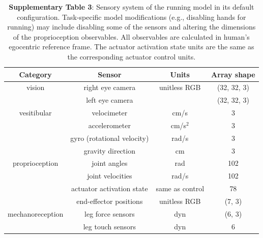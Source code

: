 \documentclass[sn-mathphys-num]{sn-jnl}%
\theoremstyle{thmstyleone}	%
\theoremstyle{thmstyletwo}	%
\theoremstyle{thmstylethree}	%
\begin{document}
\begin{appendices}
\begin{table}[htbp]
\begin{tabular}{ccc}
		\bottomrule
	\end{tabular}%
	\label{tab:s_2}%
\end{table}%




\begin{table}[htbp]
	\centering
	\small
	\caption{%
		\textbf{Supplementary Table 3}: 
		Sensory system of the running model in its default configuration. 
		Task-specific model modifications (e.g., disabling hands for running) may include disabling some of the sensors and altering the dimensions of the proprioception observables. 
		All observables are calculated in human's egocentric reference frame. 
		The actuator activation state units are the same as the corresponding actuator control units.}
	\begin{tabular}{cccc}
		\toprule
		Category         &        Sensor  & Units  & Array shape   \\
		\midrule
		vision      &   right eye camera      &    unitless RGB & (32, 32, 3)  \\
		      &   left eye camera      &     & (32, 32, 3)  \\
		\midrule
		vesitibular      &   velocimeter      &    cm/s & 3  \\
		      &   accelerometer      &    cm/s$ ^2 $ & 3  \\
		      &   gyro (rotational velocity)      &    rad/s & 3  \\
		      &   gravity direction      &    cm & 3  \\
		\midrule
		proprioception      &   joint angles      &    rad & 102  \\
		      &   joint velocities      &    rad/s & 102  \\
		      &   actuator activation state      &    same as control & 78  \\
		      &   end-effector positions      &    unitless RGB & (7, 3)  \\
		\midrule
		mechanoreception      &   leg force sensors      &    dyn & (6, 3)  \\
		      &   leg touch sensors      &    dyn & 6  \\
		\bottomrule
	\end{tabular}%
	\label{tab:s_3}%
\end{table}%







\end{appendices}
\end{document}
